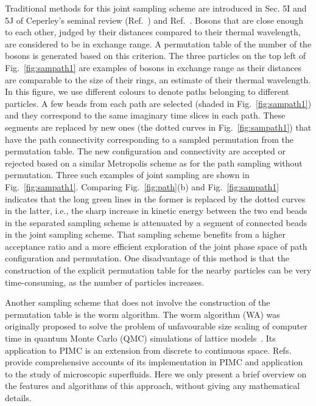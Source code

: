 \documentclass[12pt]{iopart}
\begin{document}
Traditional methods for this joint sampling scheme are introduced in Sec. 5I and 5J of Ceperley's seminal review (Ref.~\cite{ceperley_rmp_1995}) and Ref.~\cite{boninsegni_pimc_perm}. 
Bosons that are close enough to each other, judged by their distances compared to their thermal wavelength, are considered to be in  exchange range.
A permutation table of the number of the bosons is generated based on this criterion. 
The three particles on the top left of Fig.~\ref{fig:sampath1} are examples of bosons in exchange range as their distances are comparable to the size of their rings, an estimate of their thermal wavelength. 
In this figure, we use different colours to denote paths belonging to different particles. 
A few beads from each path are selected (shaded in Fig.~\ref{fig:sampath1}) and they correspond to the same imaginary time slices in each path. 
These segments are replaced by  new ones (the dotted curves in Fig.~\ref{fig:sampath1}) 
that have the path connectivity corresponding to a sampled permutation from the permutation table. 
The new configuration and connectivity are accepted or rejected based on a similar Metropolis scheme 
as for the path sampling without permutation. 
Three such examples of joint sampling are shown in Fig.~\ref{fig:sampath1}. 
Comparing  Fig.~\ref{fig:path}(b) and Fig.~\ref{fig:sampath1} indicates that the long green lines in the former is replaced by the dotted curves in the latter, i.e., the sharp increase in kinetic energy between the two end beads in the separated sampling scheme is attenuated by a segment of connected beads in the joint sampling scheme. 
That sampling scheme benefits from a higher acceptance ratio and a more efficient exploration of the joint phase space of path configuration and permutation. 
One disadvantage of this method is that the construction of the explicit permutation table for the nearby particles can be very time-consuming, as the number of particles increases. 

Another sampling scheme that does not involve the construction of the permutation table is the worm algorithm. 
The worm algorithm (WA) was originally proposed to solve the problem of unfavourable size scaling of computer time in quantum Monte Carlo (QMC) simulations of lattice models~\cite{worm_lattice1,pimc_lattice2,worm_lattice3}. 
Its application to PIMC is an extension from discrete to continuous space. 
Refs.~\cite{boninsegni_worm_1,boninsegni_worm_2} provide comprehensive accounts of its implementation in PIMC and application to the study of microscopic superfluids. 
Here we only present a brief overview on the features and algorithms of this approach, without giving any mathematical details.
\end{document}
